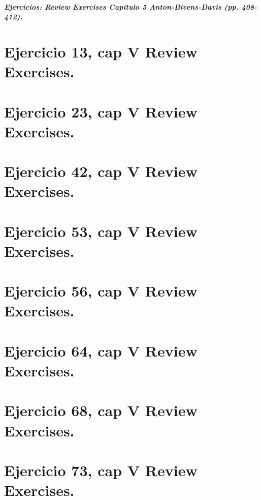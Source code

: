 \documentclass[11pt,letterpaper]{article}
\begin{document}

\subparagraph{Ejercicios: Review Exercises Capítulo 5 Anton-Bivens-Davis (pp. 408-412).}

\section{Ejercicio 13, cap V Review Exercises.}

\section{Ejercicio 23, cap V Review Exercises.}

\section{Ejercicio 42, cap V Review Exercises.}

\section{Ejercicio 53, cap V Review Exercises.}

\section{Ejercicio 56, cap V Review Exercises.}

\section{Ejercicio 64, cap V Review Exercises.}

\section{Ejercicio 68, cap V Review Exercises.}

\section{Ejercicio 73, cap V Review Exercises.}
\end{document}
